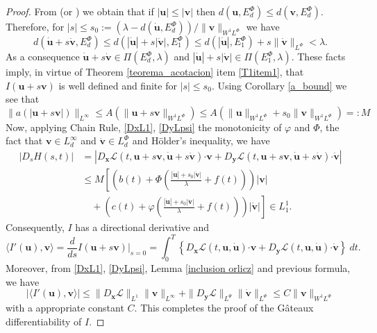 \documentclass[twoside]{article}
\theoremstyle{remark}
\newcommand{\orlnor}{\|_{L^{\Phi}}}
\newcommand{\linf}{\|_{L^{\infty}}}
\newcommand{\lphi}{L^{\Phi}}
\newcommand{\lpsi}{L^{\Psi}}
\newcommand{\ephi}{E^{\Phi}}
\newcommand{\sobnor}{\|_{W^{1}\lphi}}
\renewcommand{\b}[1]{\boldsymbol{#1}}
\newcommand{\ccdot}{\b{\cdot}}
\renewcommand{\leq}{\leqslant}
\begin{document}
\begin{proof}
From \cite[Lemma 10.1]{KR} (or \cite[Thm. 5.5]{Orliczvectorial2005} ) we obtain that if $|\b{u}|\leq |\b{v}|$ then    $d(\b{u},\ephi_d)\leq d(\b{v},\ephi_d)$. 
Therefore, for  $|s|\leq s_0:=\left(\lambda-d(\b{\dot{u}},\ephi_d)\right)/\|\b{v}\sobnor$ we have
\[
d \left(\b{\dot{u}}+s\b{\dot{v}}, \ephi_d \right)
\leq
d \left(|\b{\dot{u}}|+s|\b{\dot{v}}|, \ephi_1 \right)
\leq d \left(|\b{\dot{u}}|,\ephi_1 \right)+ s \|\b{\dot{v}}\orlnor < \lambda.
\]
As a consequence $\b{\dot{u}}+s\b{\dot{v}} \in \Pi(\ephi_d,\lambda)$ and  $|\b{\dot{u}}|+s|\b{\dot{v}}| \in \Pi(\ephi_1,\lambda)$. These facts imply, in virtue of Theorem \ref{teorema_acotacion} item \ref{T1item1}, that $I(\b{u}+s\b{v})$ is well defined and finite for $|s|\leq s_0$. 
Using  Corollary \ref{a_bound} we see that
\[ \|a(|\b{u}+s\b{v}|)\|_{L^{\infty}}\leq  A(\|\b{u}+s\b{v}\sobnor)\leq
 A(\|\b{u}\sobnor+s_0\|\b{v}\sobnor)=:M
\]
Now, applying Chain Rule, \eqref{DxL1}, \eqref{DyLpsi} the monotonicity of $\varphi$ and $\Phi$, 
the fact that $\b{v}\in L^{\infty}_d$ and $\b{\dot{v}}\in\lphi_d$ and H\"older's inequality, we have
\begin{equation}\label{ctg}
\begin{split}
|D_s H(s,t)|&=\left| D_{\b{x}}\mathcal{L}(t,\b{u}+s\b{v},\b{\dot{u}}+s\b{\dot{v}})\ccdot \b{v} +  D_{\b{y}}\mathcal{L}(t,\b{u}+s\b{v},\b{\dot{u}}+s\b{\dot{v}})\ccdot\b{\dot{v}}\right| \\
 & \leq M \left[\left( b(t)+ \Phi\left(\frac{|\b{\dot{u}}|+s_0|\b{\dot{v}}|}{\lambda}+f(t)\right)\right)|\b{v}|\right.\\
&\left. \quad+ \left(c(t)+ \varphi\left (\frac{|\b{\dot{u}}|+s_0|\b{\dot{v}}|}{\lambda}+f(t)\right)\right)|\b{\dot{v}}| \right]\in L^1_1.
\end{split}
\end{equation}
Consequently, $I$ has a directional derivative and
\[
\langle I'(\b{u}),\b{v} \rangle=\frac{d}{ds}I(\b{u}+s\b{v})\big|_{s=0}=\int_0^T  
\left\{D_{\b{x}}\mathcal{L}(t,\b{u},\b{\dot{u}})\ccdot \b{v}+ D_{\b{y}}\mathcal{L}(t,\b{u},\b{\dot{u}})\ccdot\b{\dot{v}}\right\} \ dt.
\]
Moreover, from \eqref{DxL1}, \eqref{DyLpsi}, Lemma \ref{inclusion orlicz} and previous formula, we have
\[
|\langle I'(\b{u}),\b{v} \rangle| \leq \|D_{\b{x}}\mathcal{L}\|_{L^1} \| \b{v}\linf + 
\|D_{\b{y}}\mathcal{L}\|_{\lpsi} \|\b{\dot{v}}\orlnor \leq C \|\b{v}\sobnor
\]
with a appropriate constant $C$.
This completes the proof of the G\^ateaux differentiability of $I$. 


\end{proof}
\end{document}
